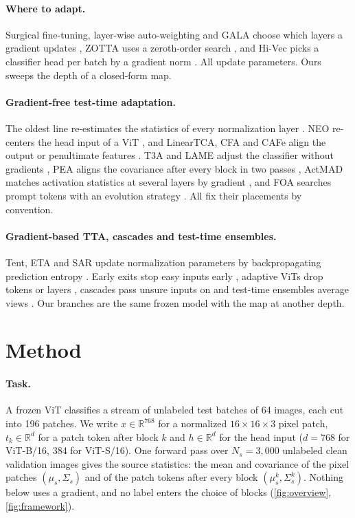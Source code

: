 \documentclass{article}
\newcommand{\neo}{NEO}
\begin{document}
\paragraph{Where to adapt.} Surgical fine-tuning, layer-wise auto-weighting and GALA choose which layers a gradient updates \citep{surgical2023,layerwise2024,gala2025}, ZOTTA uses a zeroth-order search \citep{zotta2026}, and Hi-Vec picks a classifier head per batch by a gradient norm \citep{hivec2026}. All update parameters. Ours sweeps the depth of a closed-form map.

\paragraph{Gradient-free test-time adaptation.} The oldest line re-estimates the statistics of every normalization layer \citep{schneider2020,aqr2025,quar2026}. \neo{} re-centers the head input of a ViT \citep{neo2026}, and LinearTCA, CFA and CAFe align the output or penultimate features \citep{tca2025,cfa2022,cafe2023}. T3A and LAME adjust the classifier without gradients \citep{t3a2021,lame2022}, PEA aligns the covariance after every block in two passes \citep{pea2026}, ActMAD matches activation statistics at several layers by gradient \citep{actmad2023}, and FOA searches prompt tokens with an evolution strategy \citep{foa2024}. All fix their placements by convention.

\paragraph{Gradient-based TTA, cascades and test-time ensembles.} Tent, ETA and SAR update normalization parameters by backpropagating prediction entropy \citep{tent2021,eata2022,sar2023}. Early exits stop easy inputs early \citep{branchynet2016,msdnet2018}, adaptive ViTs drop tokens or layers \citep{dynamicvit2021,adavit2022,avit2022}, cascades pass unsure inputs on \citep{committees2022} and test-time ensembles average views \citep{ttaagg2021}. Our branches are the same frozen model with the map at another depth.

\section{Method}
\label{sec:method}
\paragraph{Task.} A frozen ViT classifies a stream of unlabeled test batches of 64 images, each cut into 196 patches. We write $x\in\mathbb{R}^{768}$ for a normalized $16{\times}16{\times}3$ pixel patch, $t_k\in\mathbb{R}^{d}$ for a patch token after block $k$ and $h\in\mathbb{R}^{d}$ for the head input ($d{=}768$ for ViT-B/16, 384 for ViT-S/16). One forward pass over $N_s{=}3{,}000$ unlabeled clean validation images gives the source statistics: the mean and covariance of the pixel patches $(\mu_s,\Sigma_s)$ and of the patch tokens after every block $(\mu^k_s,\Sigma^k_s)$. Nothing below uses a gradient, and no label enters the choice of blocks (\cref{fig:overview}, \cref{fig:framework}).
\end{document}
